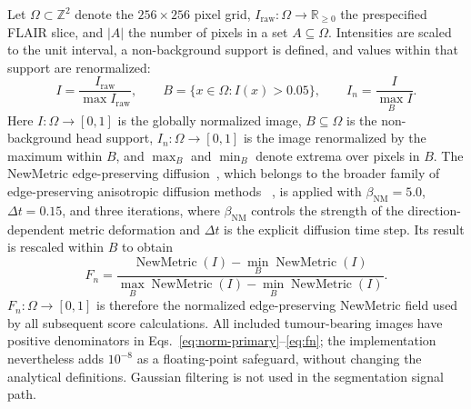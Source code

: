 \documentclass[11pt,a4paper]{article}
\begin{document}
Let $\Omega\subset\mathbb Z^2$ denote the $256\times256$ pixel grid,
$I_{\mathrm{raw}}:\Omega\rightarrow\mathbb R_{\ge0}$ the prespecified FLAIR
slice, and $|A|$ the number of pixels in a set $A\subseteq\Omega$. Intensities are
scaled to the unit interval, a non-background support is defined, and values
within that support are renormalized:
\begin{equation}
 I=\frac{I_{\mathrm{raw}}}{\max I_{\mathrm{raw}}},\qquad
 B=\{x\in\Omega:I(x)>0.05\},\qquad
 I_n=\frac{I}{\max_B I}.
\label{eq:norm-primary}
\end{equation}
Here $I:\Omega\to[0,1]$ is the globally normalized image, $B\subseteq\Omega$
is the non-background head support, $I_n:\Omega\to[0,1]$ is the image
renormalized by the maximum within $B$, and $\max_B$ and $\min_B$ denote extrema
over pixels in $B$.
The NewMetric edge-preserving diffusion~\cite{kilic2022}, which belongs to the
broader family of edge-preserving anisotropic diffusion methods
~\cite{peronamalik1990,weickert1998}, is applied with
$\beta_{\mathrm{NM}}=5.0$, $\Delta t=0.15$, and three iterations, where
$\beta_{\mathrm{NM}}$ controls the strength of the direction-dependent metric
deformation and $\Delta t$ is the explicit diffusion time step. Its result is
rescaled within $B$ to obtain
\begin{equation}
F_n=\frac{\operatorname{NewMetric}(I)-\min_B\operatorname{NewMetric}(I)}
{\max_B\operatorname{NewMetric}(I)-\min_B\operatorname{NewMetric}(I)}.
\label{eq:fn}
\end{equation}
$F_n:\Omega\to[0,1]$ is therefore the normalized edge-preserving NewMetric
field used by all subsequent score calculations.
All included tumour-bearing images have positive denominators in
Eqs.~\eqref{eq:norm-primary}--\eqref{eq:fn}; the implementation nevertheless
adds $10^{-8}$ as a floating-point safeguard, without changing the analytical
definitions.
Gaussian filtering is not used in the
segmentation signal path.
\end{document}
